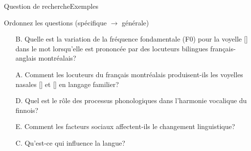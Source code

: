 \documentclass[xcolor=dvipsnames, onlymath, 10pt, aspectratio=169, handout]{beamer}
\begin{document}

\begin{frame}[t]{Question de recherche}{Exemples}


	\begin{importanttitle}{Ordonnez les questions (spécifique $\rightarrow$ générale)}


		\begin{enumerate}

			\item[B.] Quelle est la variation de la fréquence fondamentale (F0) pour la voyelle [] dans le mot  lorsqu'elle est prononcée par des locuteurs bilingues français-anglais montréalais?

			\item[A.] Comment les locuteurs du français montréalais produisent-ils les voyelles nasales [] et [] en langage familier?


			\item[D.] Quel est le rôle des processus phonologiques dans l'harmonie vocalique du finnois?

			\item[E.] Comment les facteurs sociaux affectent-ils le changement linguistique?

			\item[C.] Qu'est-ce qui influence la langue?
		\end{enumerate}
	\end{importanttitle}


\end{frame}

\end{document}
